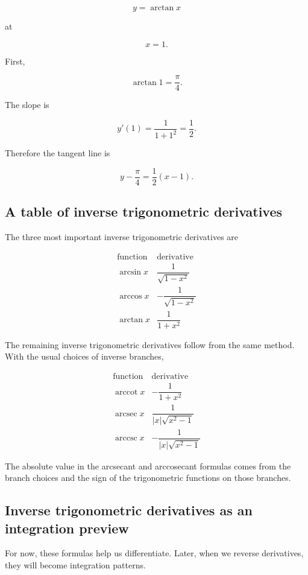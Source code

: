 \[
y=\arctan x
\]

at

\[
x=1.
\]

First,

\[
\arctan 1=\frac{\pi}{4}.
\]

The slope is

\[
y'(1)=\frac1{1+1^2}=\frac12.
\]

Therefore the tangent line is

\[
\boxed{
y-\frac{\pi}{4}=\frac12(x-1).
}
\]

\subsection{A table of inverse trigonometric derivatives}
\label{subsec:inverse-trig-derivative-table}

The three most important inverse trigonometric derivatives are

\[
\boxed{
\begin{array}{c|c}
\text{function} & \text{derivative} \\ \hline
\arcsin x & \dfrac1{\sqrt{1-x^2}} \\[8pt]
\arccos x & -\dfrac1{\sqrt{1-x^2}} \\[8pt]
\arctan x & \dfrac1{1+x^2}
\end{array}
}
\]

The remaining inverse trigonometric derivatives follow from the same method.  With the usual choices of inverse branches,

\[
\boxed{
\begin{array}{c|c}
\text{function} & \text{derivative} \\ \hline
\operatorname{arccot} x & -\dfrac1{1+x^2} \\[8pt]
\operatorname{arcsec} x & \dfrac1{|x|\sqrt{x^2-1}} \\[8pt]
\operatorname{arccsc} x & -\dfrac1{|x|\sqrt{x^2-1}}
\end{array}
}
\]

The absolute value in the arcsecant and arccosecant formulas comes from the branch choices and the sign of the trigonometric functions on those branches.

\subsection{Inverse trigonometric derivatives as an integration preview}
\label{subsec:inverse-trig-integration-preview}

For now, these formulas help us differentiate.  Later, when we reverse derivatives, they will become integration patterns.

